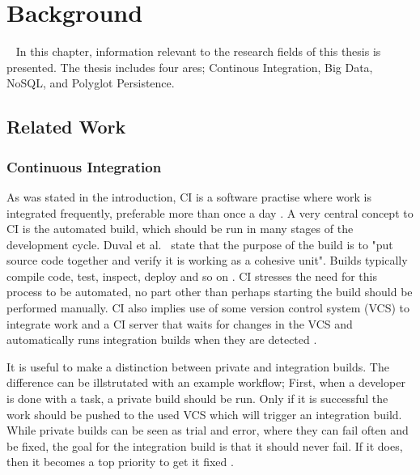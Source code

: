 \chapter{Background}
\label{chap:background}

\
In this chapter, information relevant to the research fields of this thesis is presented. The thesis includes four ares; Continous Integration, Big Data, NoSQL, and Polyglot Persistence.

\section{Related Work}

\subsection{Continuous Integration}
As was stated in the introduction, CI is a software practise where work is integrated frequently, preferable more than once a day \cite{FowlerCI}. A very central concept to CI is the automated build, which should be run in many stages of the development cycle. Duval et al.\ \cite{CIbook} state that the purpose of the build is to "put source code together and verify it is working as a cohesive unit". Builds typically compile code, test, inspect, deploy and so on \cite{CIbook}. CI stresses the need for this process to be automated, no part other than perhaps starting the build should be performed manually. CI also implies use of some version control system (VCS) to integrate work and a CI server that waits for changes in the VCS and automatically runs integration builds when they are detected \cite{FowlerCI}.

It is useful to make a distinction between private and integration builds. The difference can be illstrutated with an example workflow;
First, when a developer is done with a task, a private build should be run. Only if it is successful the work should be pushed to the used VCS which will trigger an integration build. While private builds can be seen as trial and error, where they can fail often and be fixed, the goal for the integration build is that it should never fail. If it does, then it becomes a top priority to get it fixed \cite{FowlerCI}.

